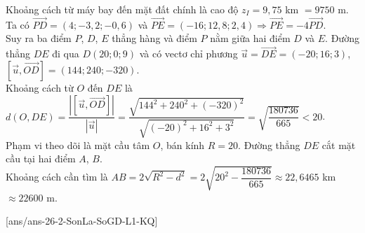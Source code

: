 \begin{ex}
{\begin{itemchoice}
Khoảng cách từ máy bay đến mặt đất chính là cao độ $z_{I}=9{,}75$ km $=9750$ m.
\itemch Ta có $\overrightarrow{PD}=(4;-3{,}2;-0{,}6)$ và $\overrightarrow{PE}=(-16;12{,}8;2{,}4) \Rightarrow \overrightarrow{PE}=-4\overrightarrow{PD}$.\\
 Suy ra ba điểm $P$, $D$, $E$ thẳng hàng và điểm $P$ nằm giữa hai điểm $D$ và $E$.
\itemch Đường thẳng $DE$ đi qua $D(20;0;9)$ và có vectơ chỉ phương $\overrightarrow{u}=\overrightarrow{DE}=(-20;16;3)$, $[\overrightarrow{u},\overrightarrow{OD}]=(144;240;-320)$. \\
Khoảng cách từ $O$ đến $DE$ là $d(O,DE)=\dfrac{\left |[\overrightarrow{u},\overrightarrow{OD}]\right |}{\left |\overrightarrow{u}\right |}=\dfrac{\sqrt{144^{2}+240^{2}+(-320)^{2}}}{\sqrt{(-20)^{2}+16^{2}+3^{2}}}=\sqrt{\dfrac{180736}{665}}<20$. \\
Phạm vi theo dõi là mặt cầu tâm $O$, bán kính $R=20$. Đường thẳng $DE$ cắt mặt cầu tại hai điểm $A$, $B$. \\
Khoảng cách cần tìm là $AB=2\sqrt{R^{2}-d^{2}}=2\sqrt{20^{2}-\dfrac{180736}{665}}\approx 22{,}6465$ km $\approx 22600$ m.
\end{itemchoice}
}
\end{ex}


\caukq
{}[ans/ans-26-2-SonLa-SoGD-L1-KQ]

